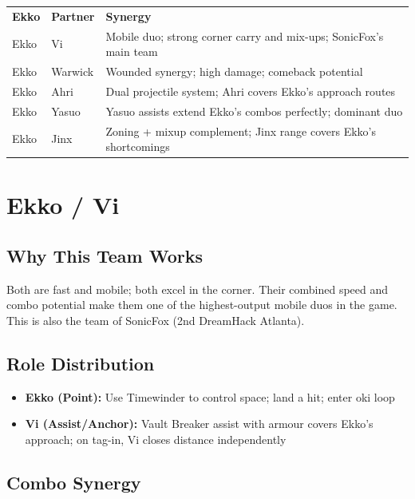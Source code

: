 \documentclass[12pt, a4paper]{report}
\begin{document}
\begin{center}
\begin{tabularx}{\linewidth}{C{2.5cm} C{2.5cm} L{9cm}}
\textcolor{ekkoBlue}{\textbf{Ekko}} & \textcolor{ekkoBlue}{\textbf{Partner}} & \textcolor{ekkoBlue}{\textbf{Synergy}} \\
Ekko & Vi & Mobile duo; strong corner carry and mix-ups; SonicFox's main team \\
Ekko & Warwick & Wounded synergy; high damage; comeback potential \\
Ekko & Ahri & Dual projectile system; Ahri covers Ekko's approach routes \\
Ekko & Yasuo & Yasuo assists extend Ekko's combos perfectly; dominant duo \\
Ekko & Jinx & Zoning + mixup complement; Jinx range covers Ekko's shortcomings \\
\end{tabularx}
\end{center}

\section{Ekko / Vi}

\subsection{Why This Team Works}

Both are fast and mobile; both excel in the corner. Their combined speed and combo potential make them one of the highest-output mobile duos in the game. This is also the team of SonicFox (2nd DreamHack Atlanta).

\subsection{Role Distribution}

\begin{itemize}
  \item \textbf{Ekko (Point):} Use Timewinder to control space; land a hit; enter oki loop
  \item \textbf{Vi (Assist/Anchor):} Vault Breaker assist with armour covers Ekko's approach; on tag-in, Vi closes distance independently
\end{itemize}

\subsection{Combo Synergy}
\end{document}
